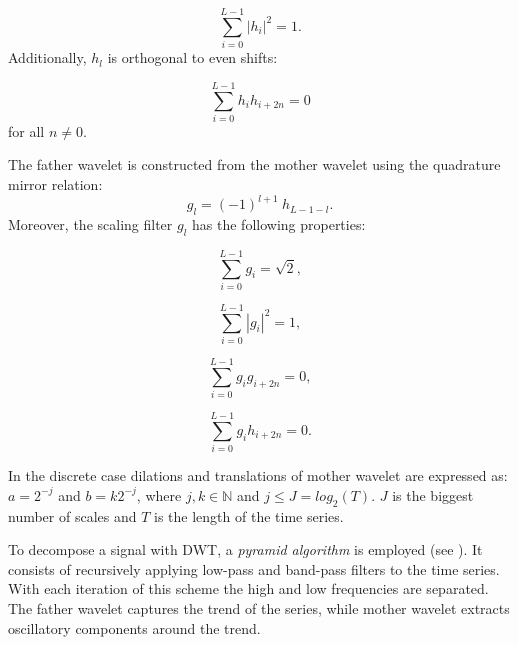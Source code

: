 \begin{equation}
	\sum_{i=0}^{L-1} |h_i|^2 = 1.
\end{equation}
Additionally, $h_l$ is orthogonal to even shifts:

\begin{equation}
	\sum_{i=0}^{L-1} h_i h_{i+2n} = 0
\end{equation}
for all $n \neq 0$.

The father wavelet is constructed from the mother wavelet using the quadrature mirror relation:
\begin{equation}
	g_l = (-1)^{l+1} \:  h_{L-1-l}.
\end{equation}
Moreover, the scaling filter $g_l$ has the following properties:
\begin{center}
\noindent
\begin{minipage}[t]{\minipagewidth}
\begin{equation}
	\sum_{i=0}^{L-1} g_i = \sqrt{2},
\end{equation}
\end{minipage}
\begin{minipage}[t]{\minipagewidth}
\begin{equation}
	\sum_{i=0}^{L-1} |g_i|^2 = 1,
\end{equation}
\end{minipage}

\begin{minipage}[t]{\minipagewidth}
\begin{equation}
	\sum_{i=0}^{L-1} g_i g_{i+2n} = 0,
\end{equation}
\end{minipage}
\begin{minipage}[t]{\minipagewidth}
\begin{equation}
	\sum_{i=0}^{L-1} g_i h_{i+2n} = 0.
\end{equation}
\end{minipage}
\end{center}

In the discrete case dilations and translations of mother wavelet are expressed as:
$a=2^{-j}$ and $b=k 2^{-j}$, where $j, k \in \mathbb{N}$ and $j \leq J = log_2(T)$.
$J$ is the biggest number of scales and $T$ is the length of the time series.

To decompose a signal with DWT, a \emph{pyramid algorithm} is employed (see ).
It consists of recursively applying low-pass and band-pass filters to the time series.
With each iteration of this scheme the high and low frequencies are separated.
The father wavelet captures the trend of the series, while mother wavelet extracts oscillatory components around the trend.

